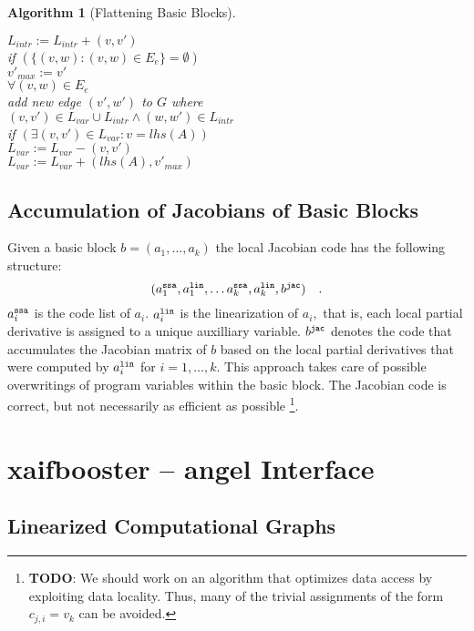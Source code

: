 \documentclass{book}
\newcommand{\todo}{{\bf TODO}}
\newtheorem{Alg}{Algorithm}
\begin{document}
\begin{Alg}[Flattening Basic Blocks]
\begin{tabbing}
\>\>\>\> $L_{intr}:=L_{intr}+(v,v')$\\
\>\>\> if $(\{(v,w):(v,w)\in E_e\}=\emptyset)$\\
\>\>\>\> $v'_{max}:=v'$\\
\> $\forall (v,w)\in E_e$ \\
\>\> add new edge $(v',w')$ to $G$ where \\
\>\> $(v,v') \in L_{var}\cup L_{intr} \wedge (w,w') \in L_{intr}$ \\
\> if $(\exists (v,v') \in L_{var}:v=lhs(A))$ \\
\>\> $L_{var}:=L_{var}-(v,v')$\\
\> $L_{var}:=L_{var}+(lhs(A),v'_{max})$\\
\end{tabbing}
\end{Alg}


\section{Accumulation of Jacobians of Basic Blocks}
\label{sec:jac_code_gen_bb}

Given a basic block $b=(a_1,\ldots,a_k)$ the local Jacobian code
has the following structure:
$$
(a_1^{\tt ssa}, a_1^{\tt lin}, \ldots
a_k^{\tt ssa}, a_k^{\tt lin}, b^{\tt jac}) \quad .$$
$a_i^{\tt ssa}$ is the code list of $a_i.$
$a_i^{\tt lin}$ is the linearization of $a_i,$ that is, each
local partial derivative is assigned to a unique auxilliary variable.
$b^{\tt jac}$ denotes the code that accumulates the Jacobian matrix of
$b$ based on the local partial derivatives that were computed by
$a_i^{\tt lin}$ for $i=1,\ldots,k.$ This approach takes care of possible
overwritings of program variables within the basic block. The Jacobian
code is correct, but not necessarily as efficient as possible
\footnote{\todo: We should work on an algorithm that optimizes
data access by exploiting data locality. Thus, many of the trivial
assignments of the form $c_{j,i}=v_k$ can be avoided.}.

\chapter{xaifbooster -- angel Interface}

\section{Linearized Computational Graphs}
\end{document}
